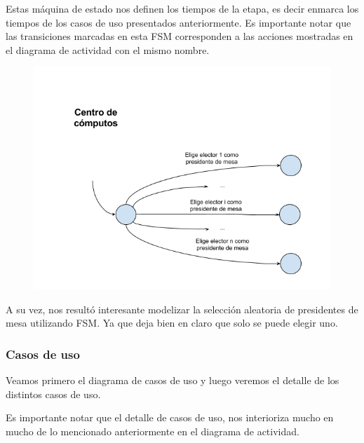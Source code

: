 Estas máquina de estado nos definen los tiempos de la etapa, es decir enmarca los tiempos de los casos de uso presentados anteriormente. Es importante notar que las transiciones marcadas en esta FSM corresponden a las acciones mostradas en el diagrama de actividad con el mismo nombre.
\begin{figure}[h!]
\centering
\includegraphics[scale=0.45]{imagenes/FSMs/Preparacion/Eleccionaleatoria}
\end{figure}
A su vez, nos resultó interesante modelizar la selección aleatoria de presidentes de mesa utilizando FSM. Ya que deja bien en claro que solo se puede elegir uno.

\newpage
\subsubsection{Casos de uso}

Veamos primero el diagrama de casos de uso y luego veremos el detalle de los distintos casos de uso.


Es importante notar que el detalle de casos de uso, nos interioriza mucho en mucho de lo mencionado anteriormente en el diagrama de actividad. 


